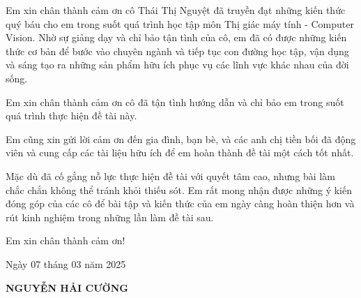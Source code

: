\documentclass[main.tex]{subfiles}
\begin{document}
Em xin chân thành cảm ơn cô Thái Thị Nguyệt đã truyền đạt những kiến thức quý báu cho em trong suốt quá trình học tập môn Thị giác máy tính - Computer Vision. Nhờ sự giảng dạy và chỉ bảo tận tình của cô, em đã có được những kiến thức cơ bản để bước vào chuyên ngành và tiếp tục con đường học tập, vận dụng và sáng tạo ra những sản phẩm hữu ích phục vụ các lĩnh vực khác nhau của đời sống.

Em xin chân thành cảm ơn cô đã tận tình hướng dẫn và chỉ bảo em trong suốt quá trình thực hiện đề tài này.

Em cũng xin gửi lời cảm ơn đến gia đình, bạn bè, và các anh chị tiền bối đã động viên và cung cấp các tài liệu hữu ích để em hoàn thành đề tài một cách tốt nhất.

Mặc dù đã cố gắng nỗ lực thực hiện đề tài với quyết tâm cao, nhưng bài làm chắc chắn không thể tránh khỏi thiếu sót. Em rất mong nhận được những ý kiến đóng góp của các cô để bài tập và kiến thức của em ngày càng hoàn thiện hơn và rút kinh nghiệm trong những lần làm đề tài sau.

\vspace{6pt}
\begin{flushright} Em xin chân thành cảm ơn! \end{flushright}

\hspace{12cm}Ngày 07 tháng 03 năm 2025

\vspace{2cm}

\hspace{12.25cm}\textbf{NGUYỄN HẢI CƯỜNG}
\end{document}
